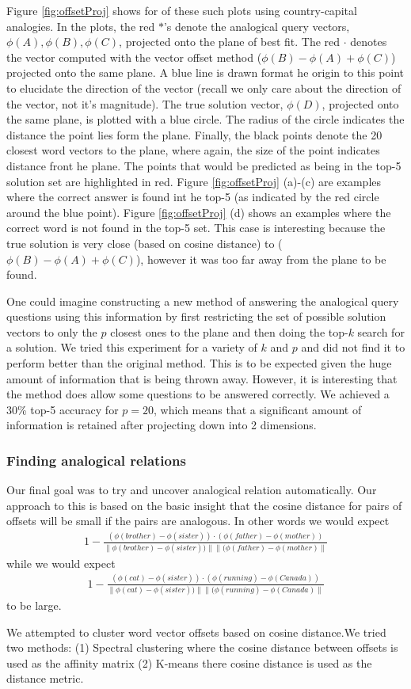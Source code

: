 Figure \ref{fig:offsetProj} shows for of these such plots using country-capital analogies. In the plots, the red $*$'s denote the analogical query vectors, $\phi(A), \phi(B), \phi(C)$, projected onto the plane of best fit. The red $\cdot$ denotes the vector computed with the vector offset method ($\phi(B) - \phi(A) + \phi(C)$) projected onto the same plane. A blue line is drawn format he origin to this point to elucidate the direction of the vector (recall we only care about the direction of the vector, not it's magnitude). The true solution vector, $\phi(D)$, projected onto the same plane, is plotted with a blue circle. The radius of the circle indicates the distance the point lies form the plane. Finally, the black points denote the 20 closest word vectors to the plane, where again, the size of the point indicates distance front he plane. The points that would be predicted as being in the top-5 solution set are highlighted in red. Figure \ref{fig:offsetProj} (a)-(c) are examples where the correct answer is found int he top-5 (as indicated by the red circle around the blue point). Figure \ref{fig:offsetProj} (d) shows an examples where the correct word is not found in the top-5 set. This case is interesting because the true solution is very close (based on cosine distance) to ($\phi(B) - \phi(A) + \phi(C)$), however it was too far away from the plane to be found. 

One could imagine constructing a new method of answering the analogical query questions using this information by first restricting the set of possible solution vectors to only the $p$ closest ones to the plane and then doing the top-$k$ search for a solution. We tried this experiment for a variety of $k$ and $p$ and did not find it to perform better than the original method. This is to be expected given the huge amount of information that is being thrown away. However, it is interesting that the method does allow some questions to be answered correctly. We achieved a 30\% top-5 accuracy for $p = 20$, which means that a significant amount of information is retained after projecting down into 2 dimensions.  

\subsubsection{Finding analogical relations}

Our final goal was to try and uncover analogical relation automatically. Our approach to this is based on the basic insight that the cosine distance for pairs of offsets will be small if the pairs are analogous. In other words we would expect 
\begin{align}1 - \frac{(\phi(brother) - \phi(sister)) \cdot (\phi(father) - \phi(mother))}{ \| \phi(brother) - \phi(sister)) \| \| (\phi(father) - \phi(mother)\|}\end{align}
while we would expect 
 \begin{align}1 - \frac{(\phi(cat) - \phi(sister)) \cdot (\phi(running) - \phi(Canada))}{ \| \phi(cat) - \phi(sister)) \| \| (\phi(running) - \phi(Canada)\|}\end{align} 
 to be large. 

We attempted to cluster word vector offsets based on cosine distance.We tried two methods: (1) Spectral clustering where the cosine distance between offsets is used as the affinity matrix (2) K-means there cosine distance is used as the distance metric. 